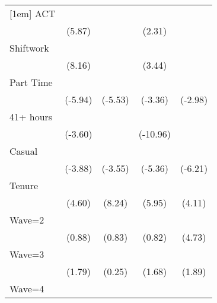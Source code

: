 {\begin{tabular}{l*{4}{c}}
[1em]
ACT                 &            \sym{***}&                     &            \sym{*}  &                     \\
                    &      (5.87)         &                     &      (2.31)         &                     \\
[1em]
Shiftwork           &            \sym{***}&                     &            \sym{***}&                     \\
                    &      (8.16)         &                     &      (3.44)         &                     \\
[1em]
Part Time           &            \sym{***}&            \sym{***}&            \sym{***}&            \sym{**} \\
                    &     (-5.94)         &     (-5.53)         &     (-3.36)         &     (-2.98)         \\
[1em]
41+ hours           &            \sym{***}&                     &            \sym{***}&                     \\
                    &     (-3.60)         &                     &    (-10.96)         &                     \\
[1em]
Casual              &            \sym{***}&            \sym{***}&            \sym{***}&            \sym{***}\\
                    &     (-3.88)         &     (-3.55)         &     (-5.36)         &     (-6.21)         \\
[1em]
Tenure              &            \sym{***}&            \sym{***}&            \sym{***}&            \sym{***}\\
                    &      (4.60)         &      (8.24)         &      (5.95)         &      (4.11)         \\
[1em]
Wave=2              &                     &                     &                     &            \sym{***}\\
                    &      (0.88)         &      (0.83)         &      (0.82)         &      (4.73)         \\
[1em]
Wave=3              &                     &                     &                     &                     \\
                    &      (1.79)         &      (0.25)         &      (1.68)         &      (1.89)         \\
[1em]
Wave=4              &            \sym{**} &                     &            \sym{**} &            \sym{***}\\

\end{tabular}}
